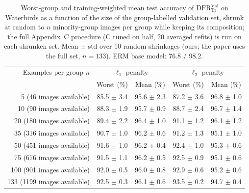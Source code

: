 \begin{table}[h]
\centering
\begin{tabular}{r cc cc }
\hline
Examples per group $n$ & \multicolumn{2}{c}{$\ell_1$ penalty} & \multicolumn{2}{c}{$\ell_2$ penalty} \\
 & Worst (\%) & Mean (\%) & Worst (\%) & Mean (\%) \\
\hline
5 (46 images available) & 85.5 $\pm$ 3.4 & 95.6 $\pm$ 2.3 & 87.2 $\pm$ 3.6 & 96.8 $\pm$ 1.0 \\
10 (90 images available) & 88.3 $\pm$ 1.9 & 95.7 $\pm$ 0.9 & 88.7 $\pm$ 2.4 & 96.7 $\pm$ 1.4 \\
20 (180 images available) & 89.4 $\pm$ 2.2 & 96.4 $\pm$ 1.0 & 91.1 $\pm$ 1.2 & 96.1 $\pm$ 1.2 \\
35 (316 images available) & 90.7 $\pm$ 1.0 & 96.2 $\pm$ 0.6 & 91.2 $\pm$ 1.3 & 95.1 $\pm$ 1.0 \\
50 (451 images available) & 91.6 $\pm$ 1.0 & 96.2 $\pm$ 0.4 & 92.4 $\pm$ 1.0 & 95.3 $\pm$ 0.6 \\
75 (676 images available) & 91.5 $\pm$ 1.1 & 96.2 $\pm$ 0.5 & 92.5 $\pm$ 0.9 & 95.1 $\pm$ 0.6 \\
100 (901 images available) & 92.0 $\pm$ 0.5 & 96.0 $\pm$ 0.8 & 92.9 $\pm$ 0.6 & 95.2 $\pm$ 0.6 \\
133 (1199 images available) & 92.5 $\pm$ 0.3 & 96.1 $\pm$ 0.6 & 93.5 $\pm$ 0.2 & 94.7 $\pm$ 0.4 \\
\hline
\end{tabular}
\caption{Worst-group and training-weighted mean test accuracy of $\mathrm{DFR}^{\mathrm{Val}}_{\mathrm{Tr}}$ on Waterbirds as a function of the size of the group-labelled validation set, shrunk at random to $n$ minority-group images per group while keeping its composition; the full Appendix~C procedure (C tuned on half, 20 averaged refits) is run on each shrunken set. Mean $\pm$ std over 10 random shrinkages (ours; the paper uses the full set, $n=133$). ERM base model: 76.8 / 98.2.}
\label{tab:size_sweep}
\end{table}
